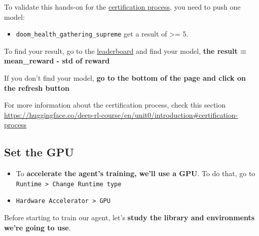 \documentclass[11pt,a4paper]{article}
\begin{document}
To validate this hands-on for the \href{https://huggingface.co/deep-rl-course/en/unit0/introduction\#certification-process}{certification process}, you need to push one model:

\begin{itemize}
\tightlist
\item
  \texttt{doom\_health\_gathering\_supreme} get a result of \textgreater= 5.
\end{itemize}

To find your result, go to the \href{https://huggingface.co/spaces/huggingface-projects/Deep-Reinforcement-Learning-Leaderboard}{leaderboard} and find your model, \textbf{the result = mean\_reward - std of reward}

If you don't find your model, \textbf{go to the bottom of the page and click on the refresh button}

For more information about the certification process, check this section \url{https://huggingface.co/deep-rl-course/en/unit0/introduction#certification-process}

\subsection{Set the GPU}\label{set-the-gpu-1}

\begin{itemize}
\tightlist
\item
  To \textbf{accelerate the agent's training, we'll use a GPU}. To do that, go to \texttt{Runtime\ \textgreater{}\ Change\ Runtime\ type}
\end{itemize}


\begin{itemize}
\tightlist
\item
  \texttt{Hardware\ Accelerator\ \textgreater{}\ GPU}
\end{itemize}


Before starting to train our agent, let's \textbf{study the library and environments we're going to use}.
\end{document}
